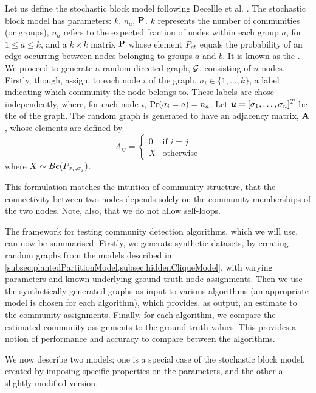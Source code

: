 Let us define the stochastic block model following Decellle et al. \cite{DKM+13}.
The stochastic block model has parameters: $k$, $n_{a}$, $\mathbf P$. $k$ represents the number of communities (or groups), $n_{a}$ refers to the expected fraction of nodes within each group $a$, for $1 \leq a \leq k$, and a $k \times k$ matrix $\mathbf P$ whose element $P_{ab}$ equals the probability of an edge occurring between nodes belonging to groups $a$ and $b$. It is known as the .
We proceed to generate a random directed graph, $\mathcal G$, consisting of $n$ nodes.
Firstly, though, assign, to each node $i$ of the graph, $\sigma_{i} \in \{1,\dots,k\}$, a label indicating which community the node belongs to.
These labels are chose independently, where, for each node $i$, $\Pr(\sigma_{i} = a) = n_{a}$.
Let $\vecvar{u} = \transpose{[\sigma_{1},\dots,\sigma_{n}]}$ be the  of the graph.
The random graph is generated to have an adjacency matrix, $\mathbf A$, whose elements are defined by
\begin{equation}
	\label{def:sbmAdjacencyMatrix}
	A_{ij} =
	\begin{cases}
		0 & \text{if } i = j\\
		X & \text{otherwise}
	\end{cases}
\end{equation}
where $X \sim Be(P_{\sigma_{i},\sigma_{j}})$.

This formulation matches the intuition of community structure, that the connectivity between two nodes depends solely on the community memberships of the two nodes.
Note, also, that we do not allow self-loops.

The framework for testing community detection algorithms, which we will use, can now be summarised.
Firstly, we generate synthetic datasets, by creating random graphs from the models described in \cref{subsec:plantedPartitionModel,subsec:hiddenCliqueModel}, with varying parameters and known underlying ground-truth node assignments.
Then we use the synthetically-generated graphs as input to various algorithms (an appropriate model is chosen for each algorithm), which provides, as output, an estimate to the community assignments.
Finally, for each algorithm, we compare the estimated community assignments to the ground-truth values.
This provides a notion of performance and accuracy to compare between the algorithms.

We now describe two models; one is a special case of the stochastic block model, created by imposing specific properties on the parameters, and the other a slightly modified version.

